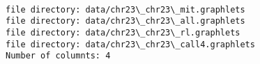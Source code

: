 \documentclass[11pt]{article}
\begin{document}
    \begin{center}
    \end{center}
    { \hspace*{\fill} \\}
    
    \begin{Verbatim}[commandchars=\\\{\}]
file directory: data/chr23\_chr23\_mit.graphlets
file directory: data/chr23\_chr23\_all.graphlets
file directory: data/chr23\_chr23\_rl.graphlets
file directory: data/chr23\_chr23\_call4.graphlets
Number of columnts: 4

    \end{Verbatim}

    \begin{center}
    \end{center}
    { \hspace*{\fill} \\}
    
\end{document}
